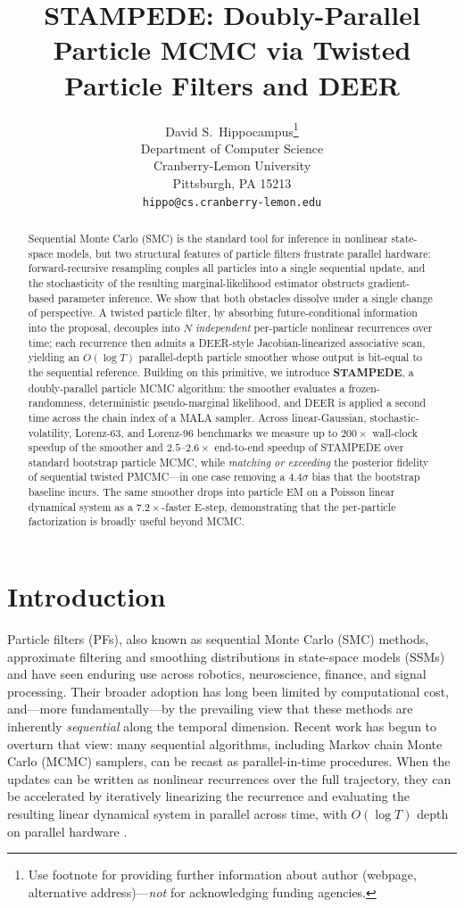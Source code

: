 \documentclass{article}
\title{STAMPEDE: Doubly-Parallel Particle MCMC via Twisted Particle Filters and DEER}
\author{%
  David S.~Hippocampus\thanks{Use footnote for providing further information
    about author (webpage, alternative address)---\emph{not} for acknowledging
    funding agencies.} \\
  Department of Computer Science\\
  Cranberry-Lemon University\\
  Pittsburgh, PA 15213 \\
  \texttt{hippo@cs.cranberry-lemon.edu} \\
}
\begin{document}
\maketitle


\begin{abstract}
    Sequential Monte Carlo (SMC) is the standard tool for inference in nonlinear state-space models, but two structural features of particle filters frustrate parallel hardware: forward-recursive resampling couples all particles into a single sequential update, and the stochasticity of the resulting marginal-likelihood estimator obstructs gradient-based parameter inference. We show that both obstacles dissolve under a single change of perspective. A twisted particle filter, by absorbing future-conditional information into the proposal, decouples into $N$ \emph{independent} per-particle nonlinear recurrences over time; each recurrence then admits a DEER-style Jacobian-linearized associative scan, yielding an $O(\log T)$ parallel-depth particle smoother whose output is bit-equal to the sequential reference. Building on this primitive, we introduce \textbf{STAMPEDE}, a doubly-parallel particle MCMC algorithm: the smoother evaluates a frozen-randomness, deterministic pseudo-marginal likelihood, and DEER is applied a second time across the chain index of a MALA sampler. Across linear-Gaussian, stochastic-volatility, Lorenz-63, and Lorenz-96 benchmarks we measure up to $200\times$ wall-clock speedup of the smoother and $2.5$--$2.6\times$ end-to-end speedup of STAMPEDE over standard bootstrap particle MCMC, while \emph{matching or exceeding} the posterior fidelity of sequential twisted PMCMC---in one case removing a $4.4\sigma$ bias that the bootstrap baseline incurs. The same smoother drops into particle EM on a Poisson linear dynamical system as a $7.2\times$-faster E-step, demonstrating that the per-particle factorization is broadly useful beyond MCMC.
\end{abstract}



\section{Introduction}
Particle filters (PFs), also known as sequential Monte Carlo (SMC) methods, approximate filtering and smoothing distributions in state-space models (SSMs) and have seen enduring use across robotics, neuroscience, finance, and signal processing. Their broader adoption has long been limited by computational cost, and---more fundamentally---by the prevailing view that these methods are inherently \emph{sequential} along the temporal dimension. Recent work has begun to overturn that view: many sequential algorithms, including Markov chain Monte Carlo (MCMC) samplers, can be recast as parallel-in-time procedures. When the updates can be written as nonlinear recurrences over the full trajectory, they can be accelerated by iteratively linearizing the recurrence and evaluating the resulting linear dynamical system in parallel across time, with $O(\log T)$ depth on parallel hardware \citep{lim2024parallelizing,gonzalez2024towards}.
\end{document}

